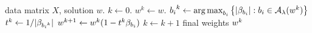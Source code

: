 \begin{algorithm}[tb]
	\caption{Optimal Solution Pruning}
	\label{alg:pruning-solutions}
	\begin{algorithmic}
		 data matrix \( X \), solution \( w \).
		\STATE \( k \gets 0 \).
		\STATE \( w^k \gets w \).
		\STATE \( {b_i}^k \gets \mathop{\rm arg\,max}_{{b_i}} \left\{|\beta_{b_i}| : {b_i} \in {\mathcal{A}_{\lambda}}(w^k)\right\}  \)
		\STATE \( t^k \gets 1/|\beta_{{b_i}^k}| \)
		\STATE \( w^{k+1} \gets w^k (1 - t^k \beta_{b_i}) \)
		\STATE \( k \gets k + 1 \)
		\ENDWHILE
		 final weights \( w^k \)
	\end{algorithmic}
\end{algorithm}


